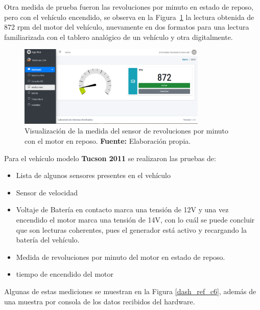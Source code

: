 Otra medida de prueba fueron las revoluciones por minuto en estado de reposo, pero con el vehículo encendido, se observa en la Figura~\ref{rpm_ref_c6} la lectura obtenida de 872 rpm del motor del vehículo, nuevamente en dos formatos para una lectura familiarizada con el tablero analógico de un vehículo y otra digitalmente. 

\begin{figure}[H]
	\centering
	\includegraphics[width=0.8\textwidth]{./Cap6imagen/rpm_fig_c6.png}
	\caption [Visualización de la medida del sensor de revoluciones por minuto con el motor en reposo.]{Visualización de la medida del sensor de revoluciones por minuto con el motor en reposo.  \textbf{ Fuente:} %
		Elaboración propia.}
	\label{rpm_ref_c6} %
\end{figure}


Para el vehículo modelo \textbf{Tucson 2011} se realizaron las pruebas de: 


\begin{itemize}
    \item Lista de algunos sensores presentes en el vehículo
    \item Sensor de velocidad
    \item Voltaje de Batería en contacto marca una tensión de 12V y una vez encendido el motor marca una tensión de 14V, con lo cuál se puede concluir que son lecturas coherentes, pues el generador está activo y recargando la batería del vehículo. 
    \item Medida de revoluciones por minuto del motor en estado de reposo. 
    \item tiempo de encendido del motor
\end{itemize}

Algunas de estas  mediciones se muestran en la Figura \ref{dash_ref_c6}, además de una muestra por consola de los datos recibidos del hardware. 

